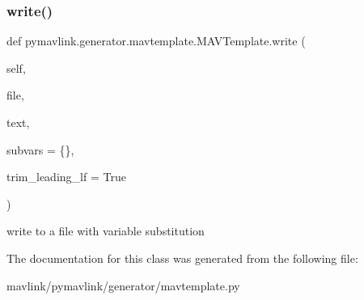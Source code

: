 \subsubsection{\texorpdfstring{write()}{write()}}
{\footnotesize\ttfamily def pymavlink.\+generator.\+mavtemplate.\+M\+A\+V\+Template.\+write (\begin{DoxyParamCaption}\item[{}]{self,  }\item[{}]{file,  }\item[{}]{text,  }\item[{}]{subvars = {\ttfamily \{\}},  }\item[{}]{trim\+\_\+leading\+\_\+lf = {\ttfamily True} }\end{DoxyParamCaption})}

\begin{DoxyVerb}write to a file with variable substitution\end{DoxyVerb}
 

The documentation for this class was generated from the following file\+:\begin{DoxyCompactItemize}
\item 
mavlink/pymavlink/generator/mavtemplate.\+py\end{DoxyCompactItemize}
